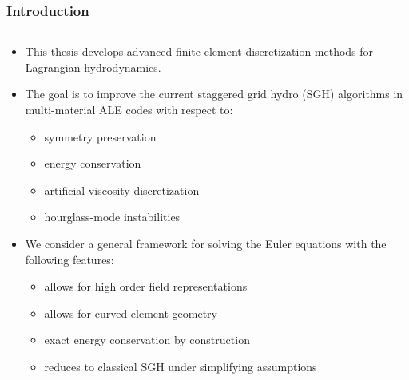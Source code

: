 \documentclass[8pt,xcolor=svgnames]{beamer}
\begin{document}
\begin{frame}
  \frametitle{Introduction}

\begin{columns}
  \begin{column}{0.6\textwidth}
  \begin{large}
    \begin{itemize}
      \item This thesis develops advanced finite element discretization methods for Lagrangian hydrodynamics.
      \item The goal is to improve the current staggered grid hydro (SGH) algorithms in multi-material ALE codes with respect to:
      \begin{itemize}
	\item symmetry preservation
	\item energy conservation
	\item artificial viscosity discretization
	\item hourglass-mode instabilities
      \end{itemize}
      \item We consider a general framework for solving the Euler equations with the following features:
      \begin{itemize}
	\item allows for high order field representations
	\item allows for curved element geometry
	\item exact energy conservation by construction
	\item reduces to classical SGH under simplifying assumptions
      \end{itemize}
    \end{itemize}
    \end{large}
  \end{column}
  

\end{columns}
\end{frame}
\end{document}
